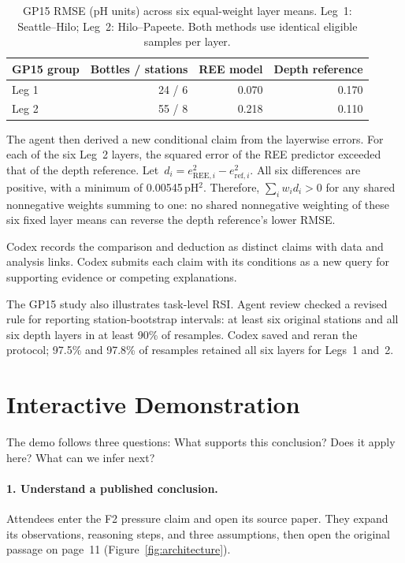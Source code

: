 \documentclass[sigconf,screen,review]{acmart}
\begin{document}
\begin{table}[b]
\caption{GP15 RMSE (pH units) across six equal-weight layer means. Leg~1: Seattle--Hilo; Leg~2: Hilo--Papeete. Both methods use identical eligible samples per layer.}
\label{tab:case}
\centering
\begin{tabular}{@{}lrrr@{}}
\toprule
GP15 group & Bottles / stations & REE model & Depth reference\\
\midrule
Leg 1 & 24 / 6 & 0.070 & 0.170\\
Leg 2 & 55 / 8 & 0.218 & 0.110\\
\bottomrule
\end{tabular}
\end{table}

The agent then derived a new conditional claim from the layerwise errors. For each of the six Leg~2 layers, the squared error of the REE predictor exceeded that of the depth reference. \mbox{Let $d_i=e_{\mathrm{REE},i}^2-e_{\mathrm{ref},i}^2$.} All six differences are positive, with a minimum of 0.00545\,pH$^2$. Therefore, $\sum_i w_i d_i>0$ for any shared nonnegative weights summing to one: no shared nonnegative weighting of these six fixed layer means can reverse the depth reference's lower RMSE.

Codex records the comparison and deduction as distinct claims with data and analysis links. Codex submits each claim with its conditions as a new query for supporting evidence or competing explanations.

The GP15 study also illustrates task-level RSI. Agent review checked a revised rule for reporting station-bootstrap intervals: at least six original stations and all six depth layers in at least 90\% of resamples. Codex saved and reran the protocol; 97.5\% and 97.8\% of resamples retained all six layers for Legs~1 and~2.

\section{Interactive Demonstration}
\label{sec:demo}
The demo follows three questions: What supports this conclusion? Does it apply here? What can we infer next?

\paragraph{1. Understand a published conclusion.}
Attendees enter the F2 pressure claim and open its source paper. They expand its observations, reasoning steps, and three assumptions, then open the original passage on page~11 (Figure~\ref{fig:architecture}).
\end{document}
